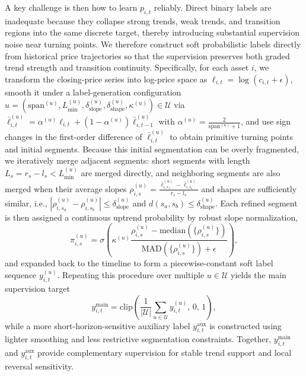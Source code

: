 \documentclass[letterpaper]{article} %
\begin{document}
A key challenge is then how to learn \(p_{i,t}\) reliably. Direct binary labels are inadequate because they collapse strong trends, weak trends, and transition regions into the same discrete target, thereby introducing substantial supervision noise near turning points. We therefore construct soft probabilistic labels directly from historical price trajectories so that the supervision preserves both graded trend strength and transition continuity. Specifically, for each asset \(i\), we transform the closing-price series into log-price space as \(\ell_{i,t}=\log(c_{i,t}+\epsilon)\), smooth it under a label-generation configuration \(u=(\mathrm{span}^{(u)},L_{\min}^{(u)},\delta_{\mathrm{slope}}^{(u)},\delta_{\mathrm{shape}}^{(u)},\kappa^{(u)})\in\mathcal U\) via \(\bar{\ell}_{i,t}^{(u)}=\alpha^{(u)}\ell_{i,t}+(1-\alpha^{(u)})\bar{\ell}_{i,t-1}^{(u)}\) with \(\alpha^{(u)}=\frac{2}{\mathrm{span}^{(u)}+1}\), and use sign changes in the first-order difference of \(\bar{\ell}_{i,t}^{(u)}\) to obtain primitive turning points and initial segments. Because this initial segmentation can be overly fragmented, we iteratively merge adjacent segments: short segments with length \(L_s=r_s-l_s<L_{\min}^{(u)}\) are merged directly, and neighboring segments are also merged when their average slopes \(\rho_{i,s}^{(u)}=\frac{\bar{\ell}_{i,r_s}^{(u)}-\bar{\ell}_{i,l_s}^{(u)}}{r_s-l_s}\) and shapes are sufficiently similar, i.e., \(|\rho_{i,s_a}^{(u)}-\rho_{i,s_b}^{(u)}|\le\delta_{\mathrm{slope}}^{(u)}\) and \(d(s_a,s_b)\le\delta_{\mathrm{shape}}^{(u)}\). Each refined segment is then assigned a continuous uptrend probability by robust slope normalization,
\[
\pi_{i,s}^{(u)}
=
\sigma\!\left(
\kappa^{(u)}
\frac{\rho_{i,s}^{(u)}-\mathrm{median}(\{\rho_{i,s}^{(u)}\})}
{\mathrm{MAD}(\{\rho_{i,s}^{(u)}\})+\epsilon}
\right),
\]
and expanded back to the timeline to form a piecewise-constant soft label sequence \(y_{i,t}^{(u)}\). Repeating this procedure over multiple \(u\in\mathcal U\) yields the main supervision target
\[
y_{i,t}^{\mathrm{main}}
=
\mathrm{clip}\!\left(
\frac{1}{|\mathcal U|}\sum_{u\in\mathcal U}y_{i,t}^{(u)},
\,0,\,1
\right),
\]
while a more short-horizon-sensitive auxiliary label \(y_{i,t}^{\mathrm{aux}}\) is constructed using lighter smoothing and less restrictive segmentation constraints. Together, \(y_{i,t}^{\mathrm{main}}\) and \(y_{i,t}^{\mathrm{aux}}\) provide complementary supervision for stable trend support and local reversal sensitivity.
\end{document}
